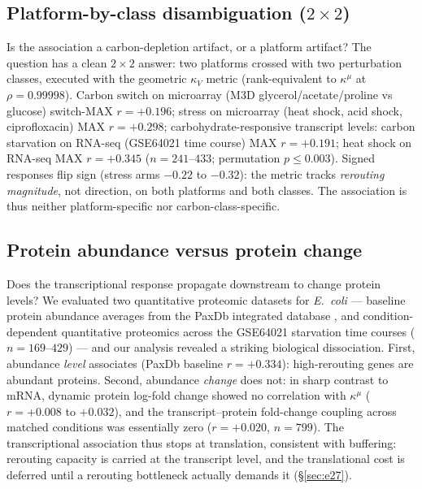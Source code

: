 \documentclass[11pt,a4paper]{article}
\theoremstyle{plain}
\theoremstyle{definition}
\theoremstyle{remark}
\newcommand{\kk}{\kappa_{\!V}}
\newcommand{\kmu}{\kappa^{\mu}}
\begin{document}
\subsection{Platform-by-class disambiguation ($2 \times 2$)}
\label{sec:e25}
Is the association a carbon-depletion artifact, or a platform
artifact? The question has a clean $2 \times 2$ answer: two platforms
crossed with two perturbation classes, executed with the geometric $\kk$ metric
(rank-equivalent to $\kmu$ at $\rho = 0.99998$). Carbon switch on
microarray (M3D glycerol/acetate/proline vs glucose) switch-MAX $r =
+0.196$; stress on microarray (heat shock, acid shock, ciprofloxacin)
MAX $r = +0.298$; carbohydrate-responsive transcript levels: carbon
starvation on RNA-seq (GSE64021 \citep{barrett2013} time course) MAX
$r = +0.191$; heat shock on RNA-seq MAX $r = +0.345$ ($n = 241$--$433$;
permutation $p \le 0.003$). Signed responses flip sign (stress arms
$-0.22$ to $-0.32$): the metric tracks \emph{rerouting magnitude},
not direction, on both platforms and both classes. The association is
thus neither platform-specific nor carbon-class-specific.

\subsection{Protein abundance versus protein change}
\label{sec:e26}
Does the transcriptional response propagate downstream to change
protein levels? We evaluated two quantitative proteomic datasets for
\emph{E.~coli} --- baseline protein abundance averages from the PaxDb
integrated database \citep{wang2015}, and condition-dependent
quantitative proteomics across the GSE64021 \citep{barrett2013}
starvation time courses ($n = 169$--$429$) --- and our analysis
revealed a striking biological dissociation. First, abundance
\emph{level} associates (PaxDb baseline $r = +0.334$): high-rerouting
genes are abundant proteins. Second, abundance \emph{change} does
not: in sharp contrast to mRNA, dynamic protein log-fold change
showed no correlation with $\kmu$ ($r = +0.008$ to $+0.032$), and
the transcript--protein fold-change coupling across matched
conditions was essentially zero ($r = +0.020$, $n = 799$). The
transcriptional association thus stops
at translation, consistent with buffering: rerouting capacity is
carried at the transcript level, and the translational cost is
deferred until a rerouting bottleneck actually demands it
(\S\ref{sec:e27}).
\end{document}
